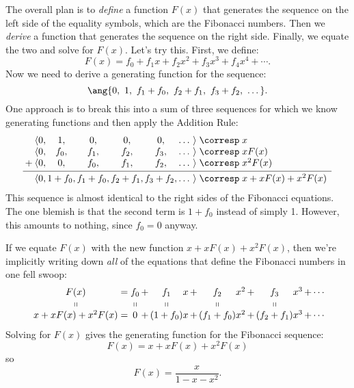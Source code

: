The overall plan is to \emph{define} a function $F(x)$ that
generates the sequence on the left side of the equality symbols, which
are the Fibonacci numbers.  Then we \emph{derive} a function that
generates the sequence on the right side.  Finally, we equate the two
and solve for $F(x)$.  Let's try this.  First, we define:
%
\[
    F(x) = f_0 + f_1 x + f_2 x^2 + f_3 x^3 + f_4 x^4 + \cdots.
\]
%
Now we need to derive a generating function for the sequence:
%
\[
    \ang{0,\ 1,\ f_1 + f_0,\ f_2 + f_1,\ f_3 + f_2,\ \dots}.
\]
%
One approach is to break this into a sum of three sequences for which
we know generating functions and then apply the Addition Rule:
%
\[
\begin{array}{@{}c@{}c@{}c@{\,}c@{\,}c@{\,}c@{\,}c@{\,}c@{\,}c@{\;}c@{\;}l}
    & \langle & 0, & 1, & 0, & 0, & 0, & \dots & \rangle
    & \corresp & x \\
    & \langle & 0, & f_0, & f_1, & f_2, & f_3, & \dots & \rangle
    & \corresp & x F(x) \\
{}+{} & \langle & 0, & 0, & f_0, & f_1, & f_2, & \dots & \rangle
    & \corresp & x^2 F(x) \\[2pt] \hline\noalign{\vskip2pt}
    & \langle & 0, & 1 + f_0, & f_1 + f_0, & f_2 + f_1, & f_3 + f_2, & \dots & \rangle
    & \corresp & x + x F(x) + x^2 F(x) \\
\end{array}
\]
%
This sequence is almost identical to the right sides of the Fibonacci
equations.  The one blemish is that the second term is $1 + f_0$
instead of simply 1.  However, this amounts to nothing, since $f_0 =
0$ anyway.

If we equate $F(x)$ with the new function $x + x F(x) + x^2 F(x)$,
then we're implicitly writing down \emph{all} of the equations that
define the Fibonacci numbers in one fell swoop:
%
\[
\begin{array}{c@{\;}c@{\;}c@{\,}c@{\,}c@{}c@{\,}c@{\,}c@{}c@{\,}c@{\,}c@{}c@{\,}c@{\,}c}
F(x)
    & = & f_0 & + & f_1 & x & + & f_2 & x^2 & + & f_3 & x^3 & + \cdots \\
\shortparallel && \shortparallel && \shortparallel &&& \shortparallel &&& \shortparallel\\
x + x F(x) + x^2 F(x)
    & = & 0 & + & (1 + f_0) & x & + & (f_1 + f_0) & x^2 & + & (f_2 + f_1) & x^3 & + \cdots
\end{array}
\]
%
Solving for $F(x)$ gives the generating function for the Fibonacci
sequence:
%
\[
F(x)  = x + x F(x) + x^2 F(x)
\]
so
\begin{equation}\label{eqn:12T4}
F(x) = \frac{x}{1 - x - x^2}.
\end{equation}

